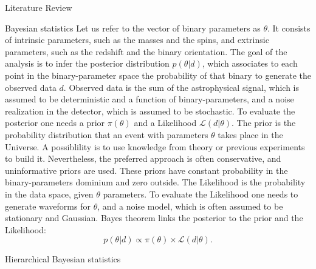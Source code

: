 \documentclass[a4paper, 12pt, twoside, openright, titlepage]{book}
\begin{document}
\begin{chapter}{Literature Review}
\begin{section}{Bayesian statistics}
Let us refer to the vector of binary parameters as $\theta$. It consists of intrinsic parameters, such as the masses and the spins, and extrinsic parameters, such as the redshift and the binary orientation.
The goal of the analysis is to infer the posterior distribution $p(\theta|d)$, which associates to each point in the binary-parameter space the probability of that binary to generate the observed data $d$. 
Observed data is the sum of the astrophysical signal, which is assumed to be deterministic and a function of binary-parameters, and a noise realization in the detector, which is assumed to be stochastic.
To evaluate the posterior one needs a prior $\pi(\theta)$ and a Likelihood $\mathcal{L}(d|\theta)$.
The prior is the probability distribution that an event with parameters $\theta$ takes place in the Universe. 
A possiblility is to use knowledge from theory or previous experiments to build it.
Nevertheless, the preferred approach is often conservative, and uninformative priors are used.
These priors have constant probability in the binary-parameters dominium and zero outside.
The Likelihood is the probability in the data space, given $\theta$ parameters.
To evaluate the Likelihood one needs to generate waveforms for $\theta$, and a noise model, which is often assumed to be stationary and Gaussian.
Bayes theorem links the posterior to the prior and the Likelihood:
\begin{equation}
p(\theta|d) \propto \pi(\theta) \times \mathcal{L}(d|\theta).
\end{equation}
\end{section}


\begin{section}{Hierarchical Bayesian statistics}

\end{section}

\begin{comment}
When emitted, they travel through the Universe carrying pristine information on the event producing them.

Since the amplitude of the wave and its evolution depend on the properties of the system, with data analysis we can infer the properties of the system producing the detected wave.


\end{comment}
\end{chapter}
\end{document}
